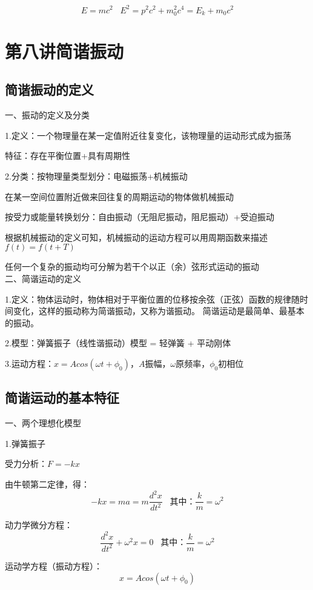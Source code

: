 \documentclass[UTF8]{article}
\begin{document}
    \[E = mc^2\;\;\;E^2 = p^2c^2 + m_0^2c^4 = E_k + m_0c^2\]
\newpage
\section{第八讲\;\;简谐振动}
\subsection{简谐振动的定义}

    一、振动的定义及分类

    1.定义：一个物理量在某一定值附近往复变化，该物理量的运动形式成为振荡

    \;\;特征：存在平衡位置+具有周期性

    2.分类：按物理量类型划分：电磁振荡+机械振动

    \;\;在某一空间位置附近做来回往复的周期运动的物体做机械振动

    \;\;按受力或能量转换划分：自由振动（无阻尼振动，阻尼振动）+受迫振动

    根据机械振动的定义可知，机械振动的运动方程可以用周期函数来描述$f(t) = f(t+T)$

    任何一个复杂的振动均可分解为若干个以正（余）弦形式运动的振动
    \\

    二、简谐运动的定义

    1.定义：物体运动时，物体相对于平衡位置的位移按余弦（正弦）函数的规律随时间变化，这样的振动称为简谐振动，又称为谐振动。
    简谐运动是最简单、最基本的振动。

    2.模型：弹簧振子（线性谐振动）模型 = 轻弹簧 + 平动刚体

    3.运动方程：$x = Acos(\omega t + \phi_0)$，$A$振幅，$\omega$原频率，$\phi_0$初相位

\subsection{简谐运动的基本特征}

    一、两个理想化模型

    1.弹簧振子

    受力分析：$F = -kx$

    由牛顿第二定律，得：
    \[-kx = ma = m\frac{d^2x}{dt^2}\;\;\;\mbox{其中：}\frac{k}{m} = \omega^2\]

    动力学微分方程：
    \[\frac{d^2x}{dt^2} + \omega^2 x = 0\;\;\;\mbox{其中：}\frac{k}{m} = \omega^2\]

    运动学方程（振动方程）：
    \[x = Acos(\omega t + \phi_0)\]
\end{document}
